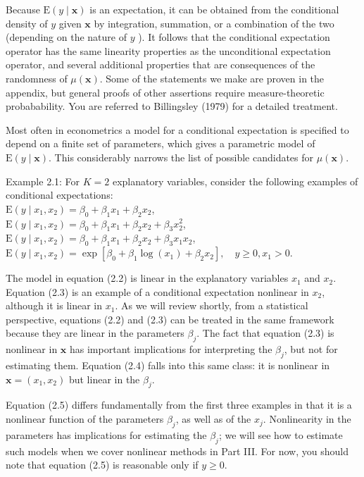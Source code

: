 \documentclass[10pt]{article}
\begin{document}
Because $\mathrm{E}(y \mid \mathbf{x})$ is an expectation, it can be obtained from the conditional density of $y$ given $\mathbf{x}$ by integration, summation, or a combination of the two (depending on the nature of $y$ ). It follows that the conditional expectation operator has the same linearity properties as the unconditional expectation operator, and several additional properties that are consequences of the randomness of $\mu(\mathbf{x})$. Some of the statements we make are proven in the appendix, but general proofs of other assertions require measure-theoretic probabability. You are referred to Billingsley (1979) for a detailed treatment.

Most often in econometrics a model for a conditional expectation is specified to depend on a finite set of parameters, which gives a parametric model of $\mathrm{E}(y \mid \mathbf{x})$. This considerably narrows the list of possible candidates for $\mu(\mathbf{x})$.

Example 2.1: For $K=2$ explanatory variables, consider the following examples of conditional expectations:\\
$\mathrm{E}\left(y \mid x_{1}, x_{2}\right)=\beta_{0}+\beta_{1} x_{1}+\beta_{2} x_{2}$,\\
$\mathrm{E}\left(y \mid x_{1}, x_{2}\right)=\beta_{0}+\beta_{1} x_{1}+\beta_{2} x_{2}+\beta_{3} x_{2}^{2}$,\\
$\mathrm{E}\left(y \mid x_{1}, x_{2}\right)=\beta_{0}+\beta_{1} x_{1}+\beta_{2} x_{2}+\beta_{3} x_{1} x_{2}$,\\
$\mathrm{E}\left(y \mid x_{1}, x_{2}\right)=\exp \left[\beta_{0}+\beta_{1} \log \left(x_{1}\right)+\beta_{2} x_{2}\right], \quad y \geq 0, x_{1}>0$.

The model in equation (2.2) is linear in the explanatory variables $x_{1}$ and $x_{2}$. Equation (2.3) is an example of a conditional expectation nonlinear in $x_{2}$, although it is linear in $x_{1}$. As we will review shortly, from a statistical perspective, equations (2.2) and (2.3) can be treated in the same framework because they are linear in the parameters $\beta_{j}$. The fact that equation (2.3) is nonlinear in $\mathbf{x}$ has important implications for interpreting the $\beta_{j}$, but not for estimating them. Equation (2.4) falls into this same class: it is nonlinear in $\mathbf{x}=\left(x_{1}, x_{2}\right)$ but linear in the $\beta_{j}$.

Equation (2.5) differs fundamentally from the first three examples in that it is a nonlinear function of the parameters $\beta_{j}$, as well as of the $x_{j}$. Nonlinearity in the parameters has implications for estimating the $\beta_{j}$; we will see how to estimate such models when we cover nonlinear methods in Part III. For now, you should note that equation (2.5) is reasonable only if $y \geq 0$.
\end{document}
